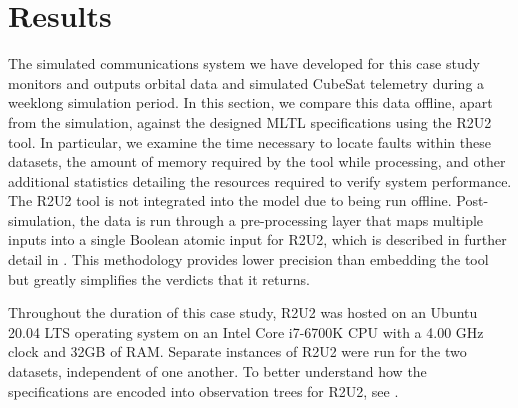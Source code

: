\documentclass[conf]{new-aiaa}
\begin{document}



\section{Results}

The simulated communications system we have developed for this case study monitors and outputs orbital data and simulated CubeSat telemetry during a weeklong simulation period. In this section, we compare this data offline, apart from the simulation, against the designed MLTL specifications using the R2U2 tool. In particular, we examine the time necessary to locate faults within these datasets, the amount of memory required by the tool while processing, and other additional statistics detailing the resources required to verify system performance. The R2U2 tool is not integrated into the model due to being run offline. Post-simulation, the data is run through a pre-processing layer that maps multiple inputs into a single Boolean atomic input for R2U2, which is described in further detail in \cite{Cauwels2020}. This methodology provides lower precision than embedding the tool but greatly simplifies the verdicts that it returns.

Throughout the duration of this case study, R2U2 was hosted on an Ubuntu 20.04 LTS operating system on an Intel Core i7-6700K CPU with a 4.00 GHz clock and 32GB of RAM. Separate instances of R2U2 were run for the two datasets, independent of one another. To better understand how the specifications are encoded into observation trees for R2U2, see \cite{Cauwels2020,SMR15,SMR16}.
\end{document}
